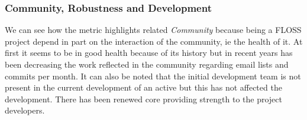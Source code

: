 \documentclass[11pt]{scrartcl}
\begin{document}
\subsubsection{Community, Robustness and Development}

\par We can see how the metric highlights related \emph{Community} because being a FLOSS project depend in part on the interaction of the community, ie the health of it. At first it seems to be in good health because of its history but in recent years has been decreasing the work reflected in the community regarding email lists and commits per month. It can also be noted that the initial development team is not present in the current development of an active but this has not affected the development. There has been renewed core providing strength to the project developers.
\end{document}
